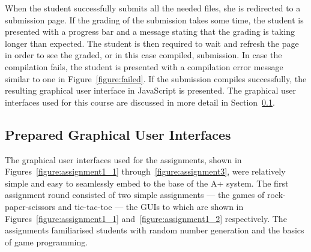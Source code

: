 When the student successfully submits all the needed files, she is redirected to a submission page. If the grading of the submission takes some time, the student is presented with a progress bar and a message stating that the grading is taking longer than expected. The student is then required to wait and refresh the page in order to see the graded, or in this case compiled, submission. In case the compilation fails, the student is presented with a compilation error message similar to one in Figure~\ref{figure:failed}. If the submission compiles successfully, the resulting graphical user interface in JavaScript is presented. The graphical user interfaces used for this course are discussed in more detail in Section~\ref{subsection:GUIs}.


\subsection{Prepared Graphical User Interfaces}
\label{subsection:GUIs}

The graphical user interfaces used for the assignments, shown in Figures~\ref{figure:assignment1_1} through~\ref{figure:assignment3}, were relatively simple and easy to seamlessly embed to the base of the A+ system. The first assignment round consisted of two simple assignments --- the games of rock-paper-scissors and tic-tac-toe --- the GUIs to which are shown in Figures~\ref{figure:assignment1_1} and~\ref{figure:assignment1_2} respectively. The assignments familiarised students with random number generation and the basics of game programming.

